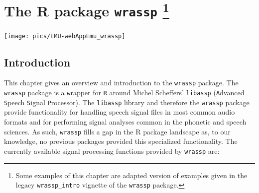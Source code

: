 \documentclass[]{book}
\let\rmarkdownfootnote\footnote%
\def\footnote{\protect\rmarkdownfootnote}
\begin{document}
\hypertarget{chap:wrassp}{%
\chapter[The R package \texttt{wrassp} ]{\texorpdfstring{The R package \texttt{wrassp} \footnote{Some examples of this chapter are adapted version of examples given in the legacy \texttt{wrassp\_intro} vignette of the \texttt{wrassp} package.}}{The R package wrassp }}\label{chap:wrassp}}

\begin{center}\texttt{[image: pics/EMU-webAppEmu\_wrassp]} \end{center}

\hypertarget{introduction}{%
\section{Introduction}\label{introduction}}

This chapter gives an overview and introduction to the \texttt{wrassp} package. The \texttt{wrassp} package is a \texttt{w}rapper for \texttt{R} around Michel Scheffers' \href{http://libassp.sourceforge.net/}{\texttt{libassp}} (\texttt{A}dvanced \texttt{S}peech \texttt{S}ignal \texttt{P}rocessor). The \texttt{libassp} library and therefore the \texttt{wrassp} package provide functionality for handling speech signal files in most common audio formats and for performing signal analyses common in the phonetic and speech sciences. As such, \texttt{wrassp} fills a gap in the R package landscape as, to our knowledge, no previous packages provided this specialized functionality. The currently available signal processing functions provided by \texttt{wrassp} are:
\end{document}
